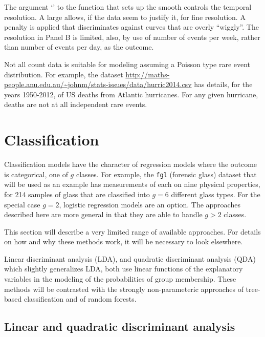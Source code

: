 The argument `' to the function  that sets up the
smooth controls the temporal resolution.  A large  allows, if the data
seem to justify it, for fine resolution. A penalty is applied that discriminates
against curves that are overly ``wiggly''.  The resolution in Panel B is
limited, also, by use of number of events per week, rather than number
of events per day, as the outcome.
\enlargethispage{12pt}

Not all count data is suitable for modeling assuming a Poisson type
rare event distribution. For example, the dataset
\url{http://maths-people.anu.edu.au/~johnm/stats-issues/data/hurric2014.csv}
has details, for the years 1950-2012, of US deaths from Atlantic
hurricanes.  For any given hurricane, deaths are not at all independent
rare events.

\section{Classification}

Classification models have the character of regression models where
the outcome is categorical, one of $g$ classes.  For example, the
\texttt{fgl} (forensic glass) dataset that will be used as an example
has measurements of each on nine physical properties, for 214 samples
of glass that are classified into $g=6$ different glass types.  For
the special case $g = 2$, logistic regression models are an
option. The approaches described here are more general in that they
are able to handle $g > 2$ classes.

This section will describe a very limited range of available
approaches.  For details
on how and why these methods work, it will be necessary to look
elsewhere.

Linear discriminant analysis (LDA), and quadratic
discriminant analysis (QDA) which slightly generalizes LDA,
both use linear functions of the explanatory variables in the
modeling of the probabilities of group membership.  These
methods will be contrasted with the strongly non-parameteric
approaches of tree-based classification and of random forests.

\subsection*{Linear and quadratic discriminant analysis}

